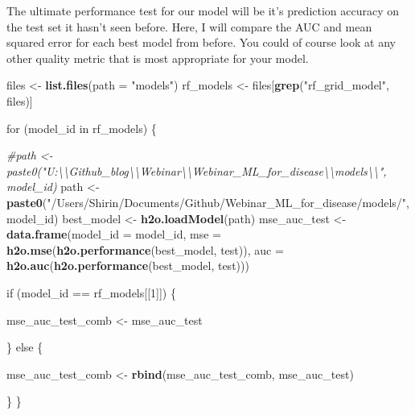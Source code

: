 \documentclass[]{article}
\newenvironment{Shaded}{\begin{snugshade}}{\end{snugshade}}
\newcommand{\KeywordTok}[1]{\textcolor[rgb]{0.13,0.29,0.53}{\textbf{{#1}}}}
\newcommand{\DataTypeTok}[1]{\textcolor[rgb]{0.13,0.29,0.53}{{#1}}}
\newcommand{\DecValTok}[1]{\textcolor[rgb]{0.00,0.00,0.81}{{#1}}}
\newcommand{\StringTok}[1]{\textcolor[rgb]{0.31,0.60,0.02}{{#1}}}
\newcommand{\CommentTok}[1]{\textcolor[rgb]{0.56,0.35,0.01}{\textit{{#1}}}}
\newcommand{\NormalTok}[1]{{#1}}
\begin{document}
The ultimate performance test for our model will be it's prediction
accuracy on the test set it hasn't seen before. Here, I will compare the
AUC and mean squared error for each best model from before. You could of
course look at any other quality metric that is most appropriate for
your model.

\begin{Shaded}
\begin{Highlighting}[]
\NormalTok{files <-}\StringTok{ }\KeywordTok{list.files}\NormalTok{(}\DataTypeTok{path =} \StringTok{"models"}\NormalTok{)}
\NormalTok{rf_models <-}\StringTok{ }\NormalTok{files[}\KeywordTok{grep}\NormalTok{(}\StringTok{"rf_grid_model"}\NormalTok{, files)]}

\NormalTok{for (model_id in rf_models) \{}
  
  \CommentTok{#path <- paste0("U:\textbackslash{}\textbackslash{}Github_blog\textbackslash{}\textbackslash{}Webinar\textbackslash{}\textbackslash{}Webinar_ML_for_disease\textbackslash{}\textbackslash{}models\textbackslash{}\textbackslash{}", model_id)}
  \NormalTok{path <-}\StringTok{ }\KeywordTok{paste0}\NormalTok{(}\StringTok{"/Users/Shirin/Documents/Github/Webinar_ML_for_disease/models/"}\NormalTok{, model_id)}
  \NormalTok{best_model <-}\StringTok{ }\KeywordTok{h2o.loadModel}\NormalTok{(path)}
  \NormalTok{mse_auc_test <-}\StringTok{ }\KeywordTok{data.frame}\NormalTok{(}\DataTypeTok{model_id =} \NormalTok{model_id, }
                             \DataTypeTok{mse =} \KeywordTok{h2o.mse}\NormalTok{(}\KeywordTok{h2o.performance}\NormalTok{(best_model, test)),}
                             \DataTypeTok{auc =} \KeywordTok{h2o.auc}\NormalTok{(}\KeywordTok{h2o.performance}\NormalTok{(best_model, test)))}
  
  \NormalTok{if (model_id ==}\StringTok{ }\NormalTok{rf_models[[}\DecValTok{1}\NormalTok{]]) \{}
    
    \NormalTok{mse_auc_test_comb <-}\StringTok{ }\NormalTok{mse_auc_test}
    
  \NormalTok{\} else \{}
    
    \NormalTok{mse_auc_test_comb <-}\StringTok{ }\KeywordTok{rbind}\NormalTok{(mse_auc_test_comb, mse_auc_test)}
    
  \NormalTok{\}}
\NormalTok{\}}


\end{Highlighting}
\end{Shaded}
\end{document}
